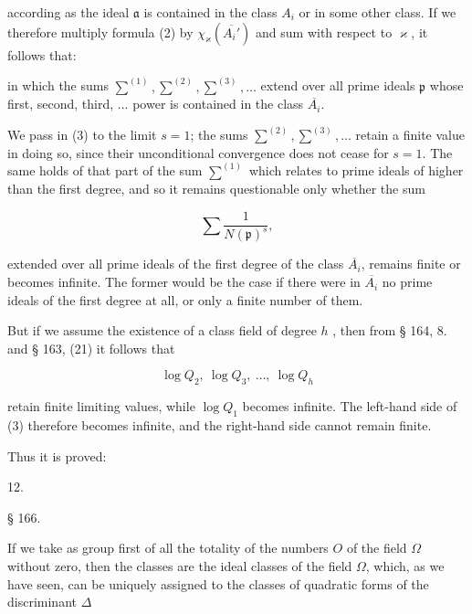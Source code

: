 
according as the ideal $\mathfrak a$ is contained in the class $A_i$ or in some other
class. If we therefore multiply formula (2) by
$\chi_\varkappa(\overline{A_i'})$ and sum with respect to $\varkappa$, it follows that:

in which the sums $\overset{(1)}{\sum}, \overset{(2)}{\sum}, \overset{(3)}{\sum}, \ldots$ extend over all prime ideals $\mathfrak p$
whose first, second, third, $\ldots$ power is contained in the class $\overline{A_i}$.

We pass in (3) to the limit $s = 1$; the sums $\overset{(2)}{\sum}, \overset{(3)}{\sum}, \ldots$
retain a finite value in doing so, since their unconditional convergence does not cease for $s = 1$. The same holds of that part
of the sum $\overset{(1)}{\sum}$ which relates to prime ideals of higher than the
first degree, and so it remains questionable only whether
the sum

\[
\sum \frac{1}{N(\mathfrak p)^s},
\]

extended over all prime ideals of the first degree of the class $\overline{A_i}$, remains
finite or becomes infinite. The former would be the case if
there were in $\overline{A_i}$ no prime ideals of the first degree at all, or only
a finite number of them.

But if we assume the existence of a class field of degree $h$%
, then from § 164, 8. and § 163, (21) it follows that

\[
\log Q_2,\ \log Q_3,\ \ldots,\ \log Q_h
\]

retain finite limiting values, while $\log Q_1$ becomes infinite. The
left-hand side of (3) therefore becomes infinite, and the right-hand side cannot
remain finite.

Thus it is proved:

12. 

\begin{center}
§ 166. \textbf{}
\end{center}

If we take as group first of all the totality of the numbers $O$
of the field $\Omega$ without zero, then the classes are the ideal classes
 of the field $\Omega$, which, as we have seen, can be uniquely assigned to the classes
of quadratic forms of the discriminant $\varDelta$
